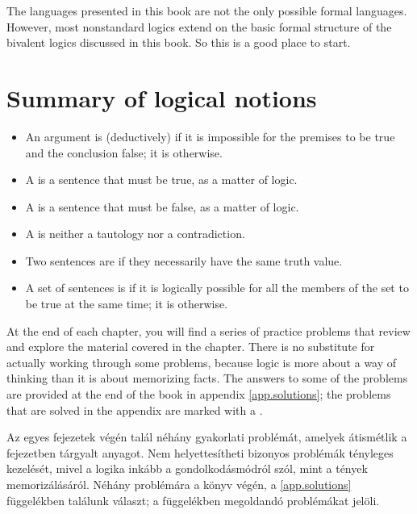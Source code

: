 The languages presented in this book are not the only possible formal languages. However, most nonstandard logics extend on the basic formal structure of the bivalent logics discussed in this book. So this is a good place to start.


\section*{Summary of logical notions}
\begin{itemize}
\item An argument is (deductively)  if it is impossible for the premises to be true and the conclusion false; it is  otherwise.

\item A  is a sentence that must be true, as a matter of logic.

\item A  is a sentence that must be false, as a matter of logic.

\item A  is neither a tautology nor a contradiction.

\item Two sentences are  if they necessarily have the same truth value.

\item A set of sentences is  if it is logically possible for all the members of the set to be true at the same time; it is  otherwise.
\end{itemize}



\practiceproblems
At the end of each chapter, you will find a series of practice problems that review and explore the material covered in the chapter. There is no substitute for actually working through some problems, because logic is more about a way of thinking than it is about memorizing facts. The answers to some of the problems are provided at the end of the book in appendix \ref{app.solutions}; the problems that are solved in the appendix are marked with a \solutions.

\practiceproblems
Az egyes fejezetek végén talál néhány gyakorlati problémát, amelyek átismétlik a fejezetben tárgyalt anyagot. Nem helyettesítheti bizonyos problémák tényleges kezelését, mivel a logika inkább a gondolkodásmódról szól, mint a tények memorizálásáról. Néhány problémára a könyv végén, a \ref{app.solutions} függelékben találunk választ; a függelékben megoldandó problémákat \solutions jelöli.

